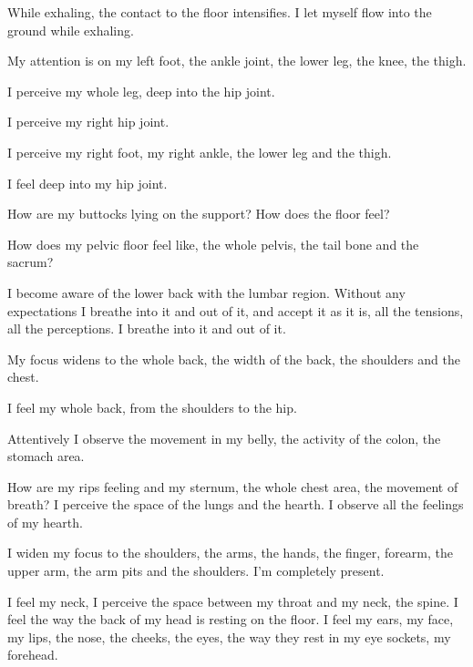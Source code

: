 \documentclass[12pt]{article}
\begin{document}
While exhaling, the contact to the floor intensifies. I let myself flow into the ground while exhaling.

\vspace{6mm}
My attention is on my left foot, the ankle joint, the lower leg, the knee, the thigh.

\vspace{6mm}
I perceive my whole leg, deep into the hip joint.

\vspace{6mm}
I perceive my right hip joint.

\vspace{6mm}
I perceive my right foot, my right ankle, the lower leg and the thigh. 

I feel deep into my hip joint.

\vspace{6mm}
How are my buttocks lying on the support? How does the floor feel?

\vspace{6mm}
How does my pelvic floor feel like, the whole pelvis, the tail bone and the sacrum?

\vspace{6mm}
I become aware of the lower back with the lumbar region. Without any expectations I breathe into it and out of it, and accept it as it is, all the tensions, all the perceptions. I breathe into it and out of it.

\vspace{6mm}
My focus widens to the whole back, the width of the back, the shoulders and the chest.

\vspace{6mm}
I feel my whole back, from the shoulders to the hip.

\vspace{6mm}
Attentively I observe the movement in my belly, the activity of the colon, the stomach area.

\vspace{6mm}
How are my rips feeling and my sternum, the whole chest area, the movement of breath? I perceive the space of the lungs and the hearth. I observe all the feelings of my hearth. 

\vspace{6mm}
I widen my focus to the shoulders, the arms, the hands, the finger, forearm, the upper arm, the arm pits and the shoulders. I'm completely present.

\vspace{6mm}
I feel my neck, I perceive the space between my throat and my neck, the spine. I feel the way the back of my head is resting on the floor. I feel my ears, my face, my lips, the nose, the cheeks, the eyes, the way they rest in my eye sockets, my forehead.
\end{document}
